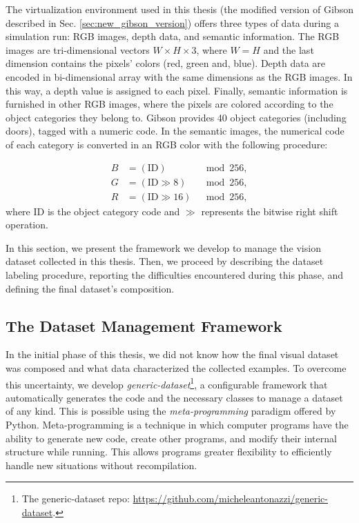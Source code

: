 The virtualization environment used in this thesis (the modified version of Gibson described in Sec. \ref{sec:new_gibson_version}) offers three types of data during a simulation run: RGB images, depth data, and semantic information. The RGB images are tri-dimensional vectors $W \times H \times 3$, where $W = H$ and the last dimension contains the pixels' colors (red, green and, blue). Depth data are encoded in bi-dimensional array with the same dimensions as the RGB images. In this way, a depth value is assigned to each pixel. Finally, semantic information is furnished in other RGB images, where the pixels are colored according to the object categories they belong to. Gibson provides 40 object categories (including doors), tagged with a numeric code. In the semantic images, the numerical code of each category is converted in an RGB color with the following procedure:

\begin{equation}
\label{eq:pareto mle2}
\begin{aligned}
B &= (\text{ID}) &\mod 256, \\
G &= (\text{ID} \gg 8) &\mod 256, \\
R &= (\text{ID} \gg 16) &\mod 256,
\end{aligned}
\end{equation}
where ID is the object category code and $\gg$ represents the bitwise right shift operation. 

In this section, we present the framework we develop to manage the vision dataset collected in this thesis. Then, we proceed by describing the dataset labeling procedure, reporting the difficulties encountered during this phase, and defining the final dataset's composition.

\subsection{The Dataset Management Framework}
\label{sec:generic_dataset}
In the initial phase of this thesis, we did not know how the final visual dataset was composed and what data characterized the collected examples. To overcome this uncertainty, we develop \textit{generic-dataset}\footnote{The generic-dataset repo: \url{https://github.com/micheleantonazzi/generic-dataset}.}, a configurable framework that automatically generates the code and the necessary classes to manage a dataset of any kind. This is possible using the \textit{meta-programming} paradigm offered by Python. Meta-programming is a technique in which computer programs have the ability to generate new code, create other programs, and modify their internal structure while running. This allows programs greater flexibility to efficiently handle new situations without recompilation. 

